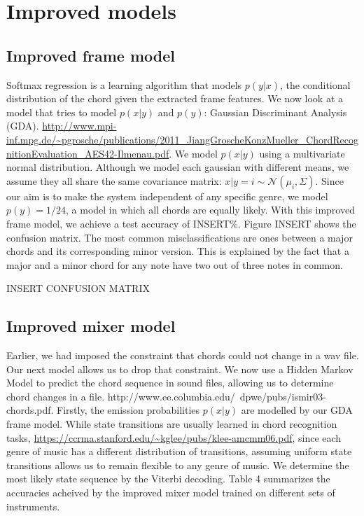 \documentclass{article}
\begin{document}
\section{Improved models}
\subsection{Improved frame model}
Softmax regression is a learning algorithm that models $p(y|x)$, the conditional distribution of the chord given the extracted frame features. We now look at a model that tries to model $p(x|y)$ and $p(y)$: Gaussian Discriminant Analysis (GDA). \url{http://www.mpi-inf.mpg.de/~pgrosche/publications/2011_JiangGroscheKonzMueller_ChordRecognitionEvaluation_AES42-Ilmenau.pdf}. We model $p(x|y)$ using a multivariate normal distribution. Although we model each gaussian with different means, we assume they all share the same covariance matrix: $x|y=i \sim \mathcal{N}$$(\mu_i, \Sigma)$. Since our aim is to make the system independent of any specific genre, we model $p(y) = 1/24$, a model in which all chords are equally likely. With this improved frame model, we achieve a test accuracy of INSERT\%. Figure INSERT shows the confusion matrix. The most common misclassifications are ones between a major chords and its corresponding minor version. This is explained by the fact that a major and a minor chord for any note have two out of three notes in common. 

INSERT CONFUSION MATRIX

\subsection{Improved mixer model}
Earlier, we had imposed the constraint that chords could not change in a wav file. Our next model allows us to drop that constraint. We now use a Hidden Markov Model to predict the chord sequence in sound files, allowing us to determine chord changes in a file. http://www.ee.columbia.edu/~dpwe/pubs/ismir03-chords.pdf. Firstly, the emission probabilities $p(x|y)$ are modelled by our GDA frame model. While state transitions are usually learned in chord recognition tasks, \url{https://ccrma.stanford.edu/~kglee/pubs/klee-amcmm06.pdf}, since each genre of music has a different distribution of transitions, assuming uniform state transitions allows us to remain flexible to any genre of music. We determine the most likely state sequence by the Viterbi decoding. Table 4 summarizes the accuracies acheived by the improved mixer model trained on different sets of instruments.
\end{document}
